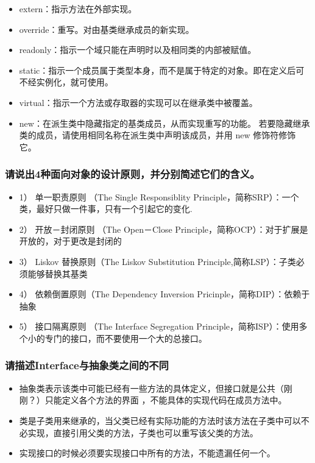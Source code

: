\documentclass[9pt, b5paper]{article}
\begin{document}
\begin{itemize}
\begin{itemize}
\item extern：指示方法在外部实现。
\item override：重写。对由基类继承成员的新实现。
\item readonly：指示一个域只能在声明时以及相同类的内部被赋值。
\item static：指示一个成员属于类型本身，而不是属于特定的对象。即在定义后可不经实例化，就可使用。
\item virtual：指示一个方法或存取器的实现可以在继承类中被覆盖。
\item new：在派生类中隐藏指定的基类成员，从而实现重写的功能。 若要隐藏继承类的成员，请使用相同名称在派生类中声明该成员，并用 new 修饰符修饰它。
\end{itemize}
\end{itemize}

\subsubsection{请说出4种面向对象的设计原则，并分别简述它们的含义。}
\label{sec:org868e495}
\begin{itemize}
\item 1） 单一职责原则 （The Single Responsiblity Principle，简称SRP）：一个类，最好只做一件事，只有一个引起它的变化.
\item 2） 开放－封闭原则 （The Open－Close Principle，简称OCP）：对于扩展是开放的，对于更改是封闭的
\item 3） Liskov 替换原则（The Liskov Substitution Principle,简称LSP）：子类必须能够替换其基类
\item 4） 依赖倒置原则（The Dependency Inversion Pricinple，简称DIP）：依赖于抽象
\item 5） 接口隔离原则 （The Interface Segregation Principle，简称ISP）：使用多个小的专门的接口，而不要使用一个大的总接口。
\end{itemize}

\subsubsection{请描述Interface与抽象类之间的不同}
\label{sec:org2b0710f}
\begin{itemize}
\item 抽象类表示该类中可能已经有一些方法的具体定义，但接口就是公共（刚刚？）只能定义各个方法的界面 ，不能具体的实现代码在成员方法中。
\item 类是子类用来继承的，当父类已经有实际功能的方法时该方法在子类中可以不必实现，直接引用父类的方法，子类也可以重写该父类的方法。
\item 实现接口的时候必须要实现接口中所有的方法，不能遗漏任何一个。
\end{itemize}
\end{document}
